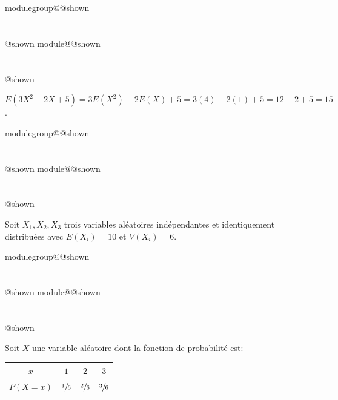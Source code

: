 \documentclass{Evaluation}
\makeatletter
\newcommand{\currentmodulekey}{}
\newcommand{\currentmoduletitle}{}
\newcommand{\currentgroupkey}{}
\newcommand{\currentgrouptitle}{}
\newcommand{\showmoduleifneeded}{%
  \ifx\currentgroupkey\empty\else
    \expandafter\ifx\csname modulegroup@\currentgroupkey @shown\endcsname\relax
      \section*{\currentgrouptitle}%
      \expandafter\gdef\csname modulegroup@\currentgroupkey @shown\endcsname{1}%
    \fi
  \fi
  \expandafter\ifx\csname module@\currentmodulekey @shown\endcsname\relax
    \section*{\currentmoduletitle}%
    \expandafter\gdef\csname module@\currentmodulekey @shown\endcsname{1}%
  \fi
}
\newenvironment{A25}{\showmoduleifneeded}{}
\makeatother
\begin{document}
\begin{questions}
\begin{A25}
\begin{parts}
    \begin{solution}
        $E(3X^2-2X+5) = 3E(X^2)-2E(X)+5 = 3(4)-2(1)+5 = 12-2+5 = 15$.
    \end{solution}
\end{parts}
\end{A25}

\begin{A25}
\question Soit $X_1, X_2, X_3$ trois variables aléatoires indépendantes et identiquement distribuées avec $E(X_i)=10$ et $V(X_i)=6$.

\end{A25}

\begin{A25}
\question Soit $X$ une variable aléatoire dont la fonction de probabilité est:

\begin{center}
\begin{tabular}{c|ccc}
    $x$ & $1$ & $2$ & $3$ \\
    \hline
    $P(X=x)$ & $\sfrac{1}{6}$ & $\sfrac{2}{6}$ & $\sfrac{3}{6}$ \\
\end{tabular}
\end{center}

\begin{parts}

\end{parts}
\end{A25}
\end{questions}
\end{document}
